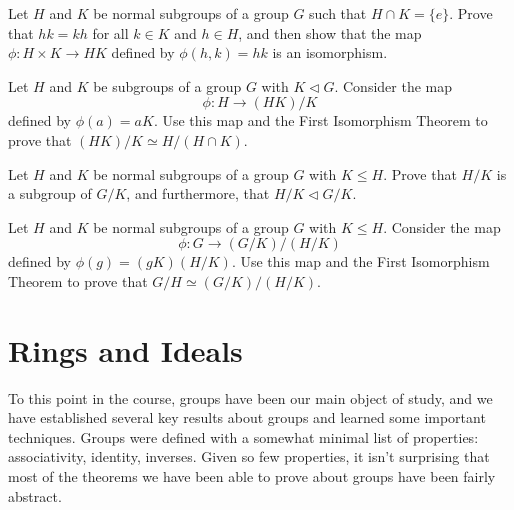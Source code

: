 \begin{problem}\label{prob:hklemma}
Let $H$ and $K$ be normal subgroups of a group $G$ such that $H\cap K = \{e\}$. Prove that $hk = kh$ for all $k\in K$ and $h\in H$, and then show that the map $\phi: H \times K \longrightarrow HK$ defined by $\phi(h,k) = hk$ is an isomorphism.
\begin{annotation}
\end{annotation}
\end{problem}

\begin{problem}\label{prob:2it}
Let \(H\) and \(K\) be subgroups of a group \(G\) with \(K \lhd G\). Consider the map \[\phi : H \longrightarrow (HK)/K\] defined by \(\phi(a) = aK\). Use this map and the First Isomorphism Theorem to prove that \((HK)/K \simeq H/(H\cap K)\).
\begin{annotation}
\end{annotation}
\end{problem}

\begin{problem}
Let \(H\) and \(K\) be normal subgroups of a group \(G\) with \(K \leq H\). Prove that \(H/K\) is a subgroup of \(G/K\), and furthermore, that \(H/K \lhd G/K\).
\end{problem}

\begin{problem}\label{prob:3it}
Let \(H\) and \(K\) be normal subgroups of a group \(G\) with \(K \leq H\). Consider the map \[\phi : G \longrightarrow (G/K)/(H/K)\] defined by \(\phi(g) = (gK)(H/K)\). Use this map and the First Isomorphism Theorem to prove that \(G/H \simeq (G/K)/(H/K)\).
\begin{annotation}
\end{annotation}
\end{problem}

\chapter{Rings and Ideals}\label{chap:rings}
To this point in the course, groups have been our main object of study, and we have established several key results about groups and learned some important techniques. Groups were defined with a somewhat minimal list of properties: associativity, identity, inverses. Given so few properties, it isn't surprising that most of the theorems we have been able to prove about groups have been fairly abstract.

